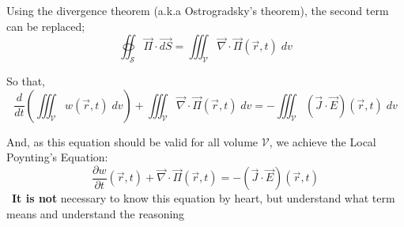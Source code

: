 \documentclass[11pt]{article}
\newcommand{\bigexclaim}{\raisebox{-0.1em}{\BigTriangleUp}\hspace{-0.32em}\llap{\small\textbf{!}}\hspace{0.32em}}
\theoremstyle{definition}
\begin{document}
Using the divergence theorem (a.k.a Ostrogradsky's theorem), the second term can be replaced;
\begin{equation}
    \oiint_{\mathcal{S}} \vec{\Pi} \cdot \vec{dS} = \iiint_{\mathcal{V}} \vec{\nabla} \cdot \vec{\Pi}\left(\vec{r},t\right)\;dv
\end{equation}

So that,
\begin{equation}
    \frac{d}{dt}\left(\iiint_{\mathcal{V}} w\left(\vec{r},t\right)\;dv\right) + \iiint_{\mathcal{V}} \vec{\nabla} \cdot \vec{\Pi}\left(\vec{r},t\right)\;dv = - \iiint_{\mathcal{V}} \left(\vec{J} \cdot \vec{E}\right)\left(\vec{r},t\right)\;dv
\end{equation}

And, as this equation should be valid for all volume $\mathcal{V}$, we achieve the Local Poynting's Equation:
\begin{equation}
    \frac{\partial w}{\partial t}\left(\vec{r},t\right) + \vec{\nabla} \cdot \vec{\Pi}\left(\vec{r},t\right) = - \left(\vec{J} \cdot \vec{E}\right)\left(\vec{r},t\right)
\end{equation}
\newline
\newline
\bigexclaim \ \textbf{It is not} necessary to know this equation by heart, but understand what term means and understand the reasoning
\end{document}
